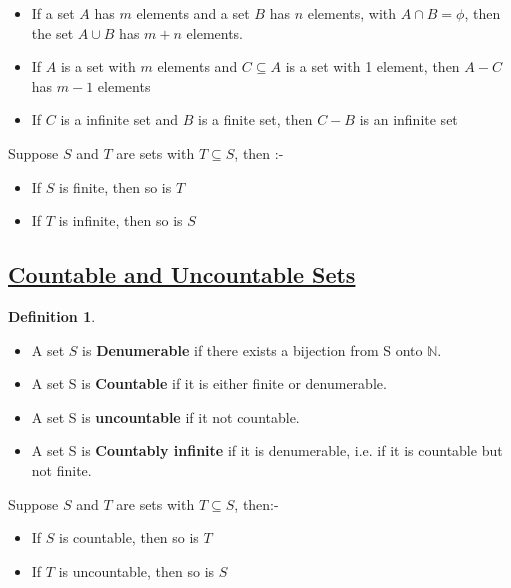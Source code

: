 \documentclass{article}
\theoremstyle{definition}
\newtheorem*{defi}{Definition}
\theoremstyle{definition}
\newenvironment{manualprop}[1]{%
  \renewcommand\themanualpropinner{#1}%
  \manualpropinner
}{\endmanualpropinner}
\theoremstyle{named}
\begin{document}
\begin{manualprop}{22}
    
\begin{itemize}
\item If a set $A$ has $m$ elements and a set $B$ has $n$ elements, with $A \cap B = \phi$, then the set $A \cup B$ has $m+n$ elements.

\item If $A$ is a set with $m$ elements and $C \subseteq A$ is a set with 1 element, then $A-C$ has $m-1$ elements
\item  If $C$ is a infinite set and $B$ is a finite set, then $C-B$ is an infinite set

\end{itemize}
\end{manualprop}

\begin{manualprop} {23}
    Suppose $S$ and $T$ are sets with $T \subseteq S$, then :-
    \begin{itemize}
        \item If $S$ is finite, then so is $T$
        \item If $T$ is infinite, then so is $S$
    \end{itemize}
\end{manualprop}

\subsection{\underline{Countable and Uncountable Sets}}
\begin{defi}
\begin{itemize}
    \item A set $S$ is \textbf{Denumerable} if there exists a bijection from S onto $\mathbb{N}$.
    \item A set S is \textbf{Countable} if it is either finite or denumerable.
    \item A set S is \textbf{uncountable} if it not countable.
    \item A set S is \textbf{Countably infinite} if it is denumerable, i.e. if it is countable but not finite. 
\end{itemize}
\end{defi}

\begin{manualprop}{24}
    Suppose $S$ and $T$ are sets with $T \subseteq S$, then:-
    \begin{itemize}
        \item If $S$ is countable, then so is $T$
        \item If $T$ is uncountable, then so is $S$
    \end{itemize}

\end{manualprop}
\end{document}
